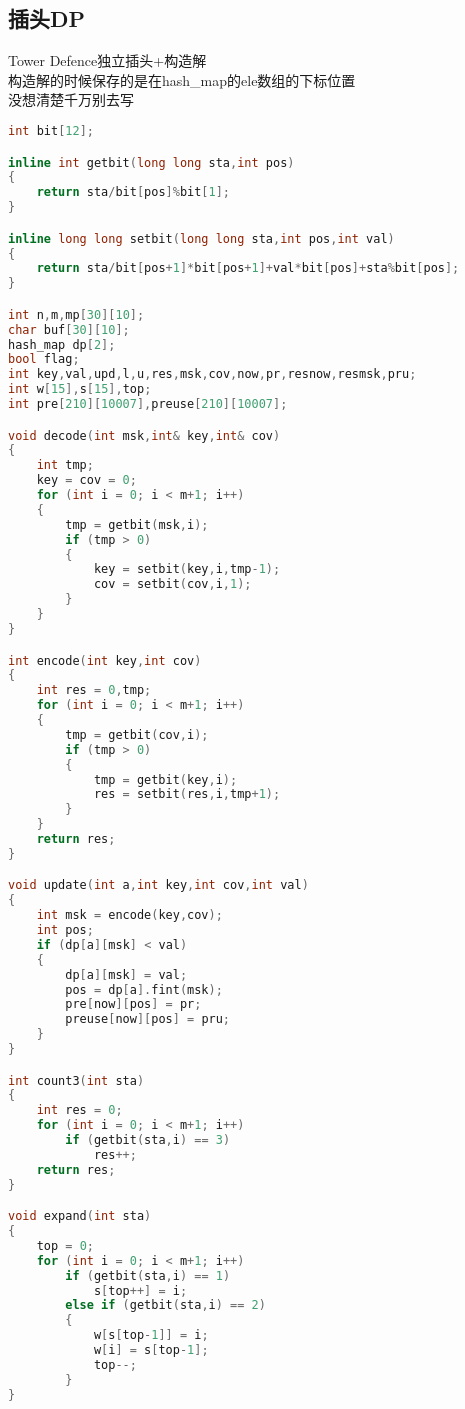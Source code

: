 \subsection{插头DP}
    Tower Defence独立插头+构造解\\
    构造解的时候保存的是在hash\_map的ele数组的下标位置\\
    没想清楚千万别去写\\
    \begin{lstlisting}[language=c++]
int bit[12];

inline int getbit(long long sta,int pos)
{
    return sta/bit[pos]%bit[1];
}

inline long long setbit(long long sta,int pos,int val)
{
    return sta/bit[pos+1]*bit[pos+1]+val*bit[pos]+sta%bit[pos];
}

int n,m,mp[30][10];
char buf[30][10];
hash_map dp[2];
bool flag;
int key,val,upd,l,u,res,msk,cov,now,pr,resnow,resmsk,pru;
int w[15],s[15],top;
int pre[210][10007],preuse[210][10007];

void decode(int msk,int& key,int& cov)
{
    int tmp;
    key = cov = 0;
    for (int i = 0; i < m+1; i++)
    {
        tmp = getbit(msk,i);
        if (tmp > 0)
        {
            key = setbit(key,i,tmp-1);
            cov = setbit(cov,i,1);
        }
    }
}

int encode(int key,int cov)
{
    int res = 0,tmp;
    for (int i = 0; i < m+1; i++)
    {
        tmp = getbit(cov,i);
        if (tmp > 0)
        {
            tmp = getbit(key,i);
            res = setbit(res,i,tmp+1);
        }
    }
    return res;
}

void update(int a,int key,int cov,int val)
{
    int msk = encode(key,cov);
    int pos;
    if (dp[a][msk] < val)
    {
        dp[a][msk] = val;
        pos = dp[a].fint(msk);
        pre[now][pos] = pr;
        preuse[now][pos] = pru;
    }
}

int count3(int sta)
{
    int res = 0;
    for (int i = 0; i < m+1; i++)
        if (getbit(sta,i) == 3)
            res++;
    return res;
}

void expand(int sta)
{
    top = 0;
    for (int i = 0; i < m+1; i++)
        if (getbit(sta,i) == 1)
            s[top++] = i;
        else if (getbit(sta,i) == 2)
        {
            w[s[top-1]] = i;
            w[i] = s[top-1];
            top--;
        }
}


\end{lstlisting}

